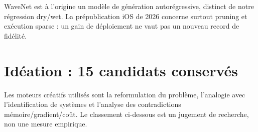\documentclass[10pt,a4paper]{article}
\begin{document}
WaveNet est \`{a} l'origine un mod\`{e}le de g\'{e}n\'{e}ration autor\'{e}gressive, distinct de notre r\'{e}gression
dry/wet. La pr\'{e}publication iOS de 2026 concerne surtout pruning et ex\'{e}cution sparse :
un gain de d\'{e}ploiement ne vaut pas un nouveau record de fid\'{e}lit\'{e}. \cite{oord2016,sato2026}

\section{Id\'{e}ation : 15 candidats conserv\'{e}s}

Les moteurs cr\'{e}atifs utilis\'{e}s sont la reformulation du probl\`{e}me, l'analogie avec l'identification
de syst\`{e}mes et l'analyse des contradictions m\'{e}moire/gradient/co\^{u}t. Le classement ci-dessous
est un jugement de recherche, non une mesure empirique.
\end{document}
